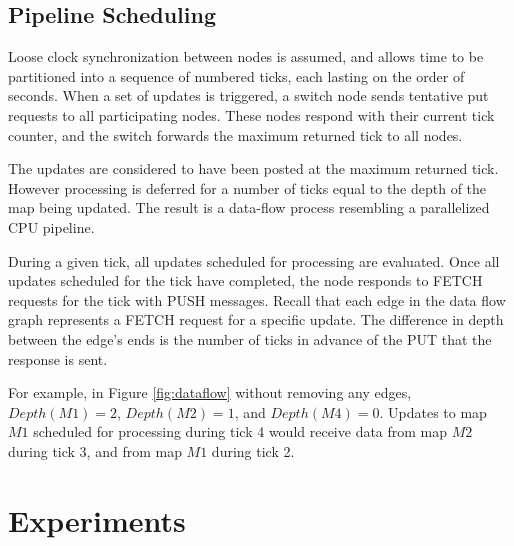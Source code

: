 \documentclass{sig-alternate}
\begin{document}
\subsection{Pipeline Scheduling}
Loose clock synchronization between nodes is assumed, and allows time to be partitioned into a sequence of numbered ticks, each lasting on the order of seconds.  When a set of updates is triggered, a switch node sends tentative put requests to all participating nodes.  These nodes respond with their current tick counter, and the switch forwards the maximum returned tick to all nodes.

The updates are considered to have been posted at the maximum returned tick.  However processing is deferred for a number of ticks equal to the depth of the map being updated.  The result is a data-flow process resembling a parallelized CPU pipeline.

During a given tick, all updates scheduled for processing are evaluated.  Once all updates scheduled for the tick have completed, the node responds to FETCH requests for the tick with PUSH messages.  Recall that each edge in the data flow graph represents a FETCH request for a specific update.  The difference in depth between the edge's ends is the number of ticks in advance of the PUT that the response is sent.  

For example, in Figure \ref{fig:dataflow} without removing any edges, $Depth(M1) = 2$, $Depth(M2) = 1$, and $Depth(M4) = 0$.  Updates to map $M1$ scheduled for processing during tick 4 would receive data from map $M2$ during tick 3, and from map $M1$ during tick 2.

%
%
%
%
%
%

\section{Experiments}
\label{sec:experiments}
\end{document}
